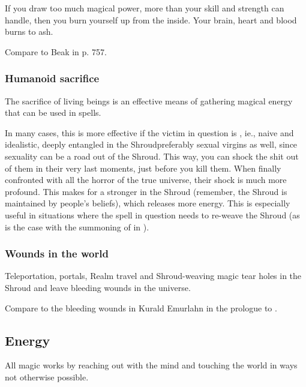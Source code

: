 If you draw too much magical power, more than your skill and strength can handle, then you burn yourself up from the inside. 
Your brain, heart and blood burns to ash.

Compare to Beak in \cite{StevenErikson:ReapersGale} p. 757. 





\subsubsection{Humanoid sacrifice}
The sacrifice of living beings is an effective means of gathering magical energy that can be used in spells. 

In many cases, this is more effective if the victim in question is , ie., naive and idealistic, deeply entangled in the Shroud\dash preferably sexual virgins as well, since sexuality can be a road out of the Shroud. 
This way, you can shock the shit out of them in their very last moments, just before you kill them. When finally confronted with all the horror of the true universe, their shock is much more profound. 
This makes for a stronger  in the Shroud (remember, the Shroud is maintained by people's beliefs), which releases more energy. 
This is especially useful in situations where the spell in question needs to re-weave the Shroud (as is the case with the summoning of  in \TwilightAngelRememberEmph).





\subsubsection{Wounds in the world}
Teleportation, portals, Realm travel and Shroud-weaving magic tear holes in the Shroud and leave bleeding wounds in the universe. 

Compare to the bleeding wounds in Kurald Emurlahn in the prologue to \MalazanReapersGale.










\subsection{Energy}
All magic works by reaching out with the mind and touching the world in ways not otherwise possible. 

